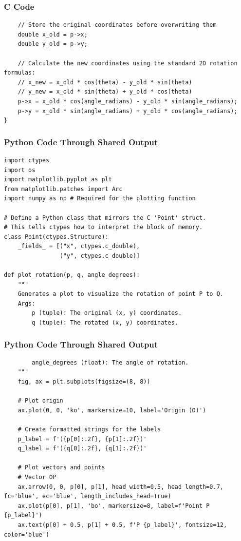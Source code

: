 \documentclass{beamer}
\begin{document}
\begin{frame}[fragile]
\frametitle{C Code}
\begin{lstlisting}
    // Store the original coordinates before overwriting them
    double x_old = p->x;
    double y_old = p->y;

    // Calculate the new coordinates using the standard 2D rotation formulas:
    // x_new = x_old * cos(theta) - y_old * sin(theta)
    // y_new = x_old * sin(theta) + y_old * cos(theta)
    p->x = x_old * cos(angle_radians) - y_old * sin(angle_radians);
    p->y = x_old * sin(angle_radians) + y_old * cos(angle_radians);
}
\end{lstlisting}
\end{frame}
\begin{frame}[fragile]
\frametitle{Python Code Through Shared Output}
\begin{lstlisting}
import ctypes
import os
import matplotlib.pyplot as plt
from matplotlib.patches import Arc
import numpy as np # Required for the plotting function

# Define a Python class that mirrors the C 'Point' struct.
# This tells ctypes how to interpret the block of memory.
class Point(ctypes.Structure):
    _fields_ = [("x", ctypes.c_double),
                ("y", ctypes.c_double)]

def plot_rotation(p, q, angle_degrees):
    """
    Generates a plot to visualize the rotation of point P to Q.
    Args:
        p (tuple): The original (x, y) coordinates.
        q (tuple): The rotated (x, y) coordinates.
        \end{lstlisting}
\end{frame}
\begin{frame}[fragile]
\frametitle{Python Code Through Shared Output}
\begin{lstlisting}
        angle_degrees (float): The angle of rotation.
    """
    fig, ax = plt.subplots(figsize=(8, 8))

    # Plot origin
    ax.plot(0, 0, 'ko', markersize=10, label='Origin (O)')

    # Create formatted strings for the labels
    p_label = f'({p[0]:.2f}, {p[1]:.2f})'
    q_label = f'({q[0]:.2f}, {q[1]:.2f})'

    # Plot vectors and points
    # Vector OP
    ax.arrow(0, 0, p[0], p[1], head_width=0.5, head_length=0.7, fc='blue', ec='blue', length_includes_head=True)
    ax.plot(p[0], p[1], 'bo', markersize=8, label=f'Point P {p_label}')
    ax.text(p[0] + 0.5, p[1] + 0.5, f'P {p_label}', fontsize=12, color='blue')
\end{lstlisting}
\end{frame}
\end{document}
